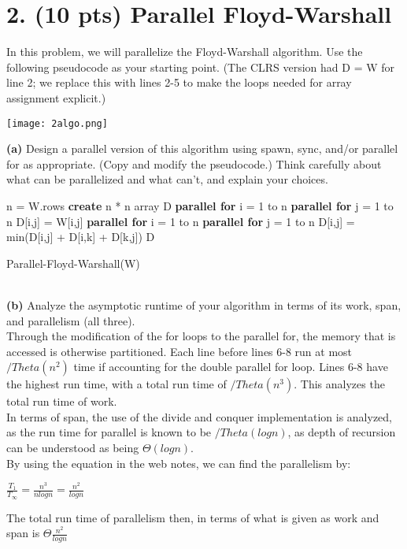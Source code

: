 \documentclass[12pt]{article}
\begin{document}
\section*{2. (10 pts) Parallel Floyd-Warshall}
In this problem, we will parallelize the Floyd-Warshall algorithm. Use the following pseudocode as your starting point. (The CLRS version had D = W for line 2; we replace this with lines 2-5 to make the loops needed for array assignment explicit.) \\
\begin{center}
\texttt{[image: 2algo.png]} \\
\end{center}
\textbf{(a)} Design a parallel version of this algorithm using spawn, sync, and/or parallel for as appropriate. (Copy and modify the pseudocode.) Think carefully about what can be parallelized and what can't, and explain your choices.  \\
\linebreak
\begin{algorithm}[H]
\SetAlgoLined
n = W.rows\;
\textbf{create} n * n array D\;
\textbf{parallel for} {i = 1 to n}\;
{
\textbf{parallel for} {j = 1 to n}\;
{
D[i,j] = W[i,j]\;
}
}
 {
\textbf{parallel for} {i = 1 to n}\; {
\textbf{parallel for} {j = 1 to n}\; {
D[i,j] = min(D[i,j] + D[i,k] + D[k,j])\;
}
}
}
\EndFor
\Return D \;
 \caption{Parallel-Floyd-Warshall(W)}
\end{algorithm} \\
\textbf{(b)} Analyze the asymptotic runtime of your algorithm in terms of its work, span, and parallelism (all three).  \\
\linebreak
Through the modification of the for loops to the parallel for, the memory that is accessed is otherwise partitioned. Each line before lines 6-8 run at most $/Theta(n^2)$ time if accounting for the double parallel for loop. Lines 6-8 have the highest run time, with a total run time of $/Theta(n^3)$. This analyzes the total run time of work. \\
\linebreak
In terms of span, the use of the divide and conquer implementation is analyzed, as the run time for parallel is known to be $/Theta(logn)$, as depth of recursion can be understood as being $\Theta(logn)$. \\
\linebreak
By using the equation in the web notes, we can find the parallelism by: \\
\linebreak
\begin{center}
$\frac{T_1}{T_{\infty}} = \frac{n^3}{nlogn} = \frac{n^2}{logn}$ \\
\end{center}
The total run time of parallelism then, in terms of what is given as work and span is $\Theta\frac{n^2}{logn}$\\
\end{document}
